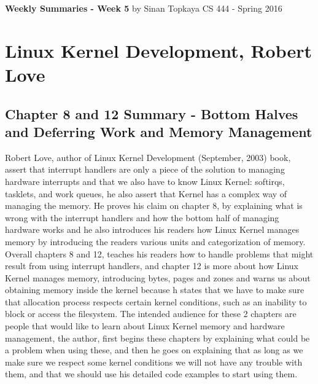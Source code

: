 \documentclass[letterpaper,10pt,draftclsnofoot,onecolumn]{IEEEtran}
\begin{document}
\begin{titlepage}
	
	\begin{center}
	\bigbreak
	\textbf{Weekly Summaries - Week 5}
	\bigbreak
	by Sinan Topkaya
	\smallbreak
	CS 444 - Spring 2016
	\end{center}
\end{titlepage}
	
\section*{Linux Kernel Development, Robert Love}
\subsection*{Chapter 8 and 12 Summary - Bottom Halves and Deferring Work and Memory Management}

Robert Love, author of Linux Kernel Development (September, 2003) book, assert that interrupt handlers are only a piece of the solution to managing hardware interrupts and that we also have to know Linux Kernel: softirqs, tasklets, and work queues, he also assert that Kernel has a complex way of managing the memory. He proves his claim on chapter 8, by explaining what is wrong with the interrupt handlers and how the bottom half of managing hardware works and he also introduces his readers how Linux Kernel manages memory by introducing the readers various units and categorization of memory. Overall chapters 8 and 12, teaches his readers how to handle problems that might result from using interrupt handlers, and chapter 12 is more about how Linux Kernel manages memory, introducing bytes, pages and zones and warns us about obtaining memory inside the kernel because h states that we have to make sure that allocation process respects certain kernel conditions, such as an inability to block or access the filesystem. The intended audience for these 2 chapters are people that would like to learn about Linux Kernel memory and hardware management, the author, first begins these chapters by explaining what could be a problem when using these, and then he goes on explaining that as long as we make sure we respect some kernel conditions we will not have any trouble with them, and that we should use his detailed code examples to start using them.
\end{document}
